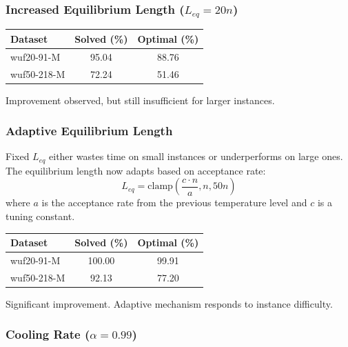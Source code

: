 \documentclass[11pt]{article}
\begin{document}
    \subsubsection{Increased Equilibrium Length (\texorpdfstring{$L_{eq} = 20n$}{Leq = 20n})}

    \begin{center}
        \begin{tabular}{lcc}
            \toprule
            Dataset     & Solved (\%) & Optimal (\%) \\
            \midrule
            wuf20-91-M  & 95.04       & 88.76        \\
            wuf50-218-M & 72.24       & 51.46        \\
            \bottomrule
        \end{tabular}
    \end{center}

    \noindent Improvement observed, but still insufficient for larger instances.

    \subsubsection{Adaptive Equilibrium Length}
    \label{sec:adaptive-leq}

    Fixed $L_{eq}$ either wastes time on small instances or underperforms on large ones.
    The equilibrium length now adapts based on acceptance rate:
    \[
        L_{eq} = \text{clamp}\left(\frac{c \cdot n}{a}, n, 50n\right)
    \]
    where $a$ is the acceptance rate from the previous temperature level and $c$ is a tuning constant.

    \begin{center}
        \begin{tabular}{lcc}
            \toprule
            Dataset     & Solved (\%) & Optimal (\%) \\
            \midrule
            wuf20-91-M  & 100.00      & 99.91        \\
            wuf50-218-M & 92.13       & 77.20        \\
            \bottomrule
        \end{tabular}
    \end{center}

    \noindent Significant improvement. Adaptive mechanism responds to instance difficulty.

    \subsubsection{Cooling Rate (\texorpdfstring{$\alpha = 0.99$}{alpha = 0.99})}
\end{document}
